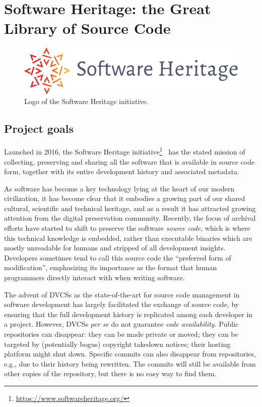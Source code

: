 \chapter{Software Heritage: the Great Library of Source Code}%
\label{chp:software-heritage}

\begin{figure}
    \centering
    \includegraphics[width=0.5\linewidth]{img/SWH-logo}
    \caption{Logo of the Software Heritage initiative.}
\end{figure}

\section{Project goals}

Launched in 2016, the Software Heritage
initiative\footnote{\url{https://www.softwareheritage.org/}}~\cite{swhcacm2018}
has the stated mission of collecting, preserving and sharing all the software
that is available in source code form, together with its entire development
history and associated metadata.

As software has become a key technology lying at the heart of our modern
civilization, it has become clear that it embodies a growing part of our shared
cultural, scientific and technical heritage, and as a result it has attracted
growing attention from the digital preservation community.
Recently, the focus of archival efforts have started to shift to preserve the
software \emph{source code}, which is where this technical knowledge is
embedded, rather than executable binaries which are mostly unreadable for
humans and stripped of all development insights. Developers sometimes tend to
call this source code the ``preferred form of modification'', emphasizing its
importance as the format that human programmers directly interact with when
writing software.

The advent of \glspl{DVCS} as the state-of-the-art for source code management
in software development has largely facilitated the exchange of source code,
by ensuring that the full development history is replicated among each
developer in a project. However, \glspl{DVCS} \emph{per se} do not guarantee
\emph{code availability}. Public repositories can disappear: they can be made
private or moved; they can be targeted by (potentially bogus) copyright
takedown notices; their hosting platform might shut down. Specific commits can
also disappear from repositories, e.g., due to their history being rewritten.
The commits will still be available from other copies of the repository, but
there is no easy way to find them.

